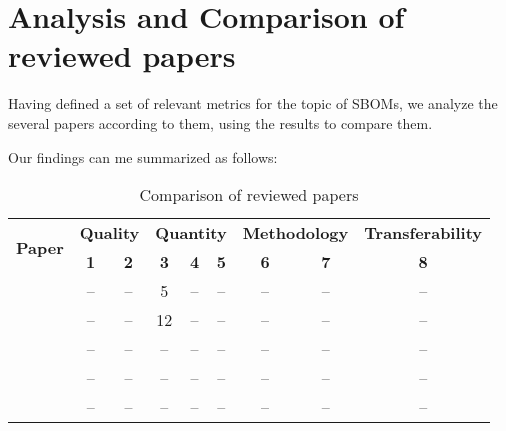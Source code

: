 \section{Analysis and Comparison of reviewed papers} \label{analysis}

\noindent Having defined a set of relevant metrics for the topic of SBOMs, we analyze the several papers according to them, using the results to compare them.

\noindent Our findings can me summarized as follows:

\begin{table}[h]
    \centering
    \begin{tabular}{c|c|c|c|c|c|c|c|c}
        \multirow{2}{*}{\textbf{Paper}} & \multicolumn{2}{c|}{\textbf{Quality}}& \multicolumn{3}{c|}{\textbf{Quantity}} & \multicolumn{2}{c|}{\textbf{Methodology}} & \textbf{Transferability} \\
        \cline{2-9}
        & \textbf{1} & \textbf{2} & \textbf{3} & \textbf{4} & \textbf{5} & \textbf{6} & \textbf{7} & \textbf{8} \\
        \hline
        \hline
        \cite{article:sbom-required} & -- & -- & 5 & -- & -- & -- & -- & -- \\
        \hline
        \cite{article:software-bom} & -- & -- & 12 & -- & -- & -- & -- & -- \\
        \hline
        \cite{article:sbom-study} & -- & -- & -- & -- & -- & -- & -- & -- \\
        \hline
        \cite{article:sboms-issues-solutions} & -- & -- & -- & -- & -- & -- & -- & -- \\
        \hline
        \cite{article:business-sbom} & -- & -- & -- & -- & -- & -- & -- & --
    \end{tabular}
    \caption{Comparison of reviewed papers}
    \label{tab:comparison}
\end{table}
